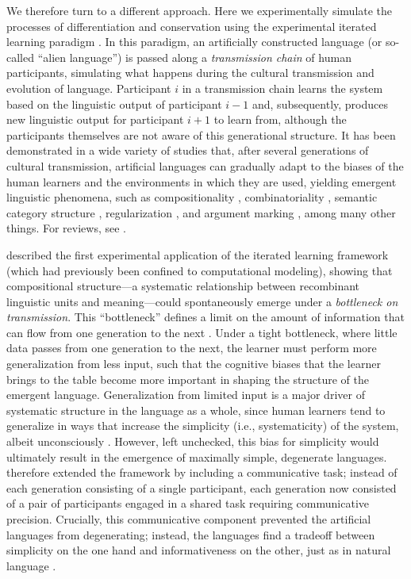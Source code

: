 \documentclass[doc,biblatex]{apa7}
\begin{document}
We therefore turn to a different approach. Here we experimentally simulate the processes of differentiation and conservation using the experimental iterated learning paradigm \parencite{Kirby:2008}. In this paradigm, an artificially constructed language (or so-called ``alien language'') is passed along a \textit{transmission chain} of human participants, simulating what happens during the cultural transmission and evolution of language. Participant $i$ in a transmission chain learns the system based on the linguistic output of participant $i-1$ and, subsequently, produces new linguistic output for participant $i+1$ to learn from, although the participants themselves are not aware of this generational structure. It has been demonstrated in a wide variety of studies that, after several generations of cultural transmission, artificial languages can gradually adapt to the biases of the human learners and the environments in which they are used, yielding emergent linguistic phenomena, such as compositionality \parencite{Beckner:2017, Kirby:2008, Kirby:2015}, combinatoriality \parencite{Verhoef:2015}, semantic category structure \parencite{Carr:2017, Canini:2014, Silvey:2019}, regularization \parencite{Smith:2010}, and argument marking \parencite{Motamedi:2021}, among many other things. For reviews, see \textcite{Bailes:2023, Kirby:2014, Kirby:2017, Smith:2022, Tamariz:2017}.

\textcite{Kirby:2008} described the first experimental application of the iterated learning framework (which had previously been confined to computational modeling), showing that compositional structure---a systematic relationship between recombinant linguistic units and meaning---could spontaneously emerge under a \textit{bottleneck on transmission}. This ``bottleneck'' defines a limit on the amount of information that can flow from one generation to the next \parencite{Brighton:2002}. Under a tight bottleneck, where little data passes from one generation to the next, the learner must perform more generalization from less input, such that the cognitive biases that the learner brings to the table become more important in shaping the structure of the emergent language. Generalization from limited input is a major driver of systematic structure in the language as a whole, since human learners tend to generalize in ways that increase the simplicity (i.e., systematicity) of the system, albeit unconsciously \parencite{Culbertson:2016}. However, left unchecked, this bias for simplicity would ultimately result in the emergence of maximally simple, degenerate languages. \textcite{Kirby:2015} therefore extended the framework by including a communicative task; instead of each generation consisting of a single participant, each generation now consisted of a pair of participants engaged in a shared task requiring communicative precision. Crucially, this communicative component prevented the artificial languages from degenerating; instead, the languages find a tradeoff between simplicity on the one hand and informativeness on the other, just as in natural language \parencite{Mollica:2021, KempRegier:2012, Kemp:2018, Regier:2015, Zaslavsky:2018}.
\end{document}
